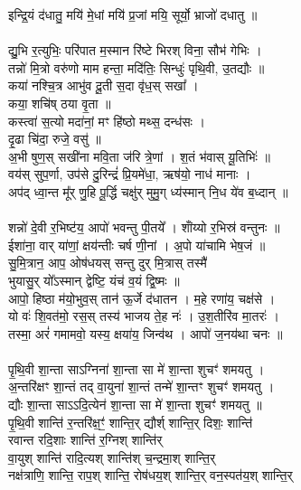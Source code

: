 इन्द्रि॒यं द॑धातु॒ मयि॑ मे॒धां मयि॑ प्र॒जां मयि॒ सूर्यो॒ भ्राजो॑ दधातु ॥\\
\\
द्यु॒भि र॒त्युभिः॒ परि॑पात म॒स्मान रि॑ष्टे भिरश् विना॒ सौभ॑ गेभिः । \\
तन्नो॑ मि॒त्रो वरु॑णो माम हन्ता॒ मदि॑तिः॒ सिन्धुः॑ पृथि॒वी, उ॒तद्यौः ॥\\
कया॑ नश्चि॒त्र आभु॑व दू॒ती स॒दा वृ॑ध॒स् सखा᳚ । \\
कया॒ शचि॑ष् ठया वृ॒ता ॥\\
कस्त्वा॑ स॒त्यो मदा॑नां॒ मꣳ हि॑ष्ठो मथ्स॒ दन्ध॑सः । \\
दृ॒ढा चि॑दा॒ रुजे॒ वसु॑ ॥\\
अ॒भी षुण॒स् सखी॑ना मवि॒ता ज॑रि त्रे॒णां । श॒तं भ॑वास् यू॒तिभिः॑ ॥\\
वय॑स् सुप॒र्णा, उप॑से दु॒रिन्द्रं॑ प्रि॒यमे॑धा॒, ऋष॑यो॒ नाध॑ मानाः । \\
अप॑द् ध्वा॒न्त मू᳚र् णु॒हि पू॒र्द्धि चक्षु॑र् मुमु॒ग् ध्य॑स्मान् नि॒ध ये॑व ब॒ध्दान् ॥\\
\\
शन्नो॑ दे॒वी र॒भिष्ट॑य॒ आपो॑ भवन्तु पी॒तये᳚ । शांँय्यो र॒भिस्र॑ वन्तुनः ॥\\
ईशा॑ना॒ वार् या॑णां॒ क्षय॑न्तीः चर्ष णी॒नां । अ॒पो या॑चामि भेष॒जं ॥\\
सु॒मि॒त्रान॒ आप॒ ओष॑धयस् सन्तु दुर् मि॒त्रास् तस्मै॑ \\
भुयासु॒र् यो᳚ऽस्मान् द्वेष्टि॒ यंच॑ व॒यं द्वि॒ष्मः ॥\\
आपो॒ हिष्ठा म॑यो॒भुव॒स् तान॑ ऊ॒र्जे द॑धातन । म॒हे रणा॑य॒ चक्ष॑से । \\
यो वः॑ शि॒वत॑मो॒ रस॒स् तस्य॑ भाजय ते॒ह नः॑ । उ॒श॒तीरि॑व मा॒तरः॑ ।\\
तस्मा॒ अरं॑ गमामवो॒ यस्य॒ क्षया॑य॒ जिन्व॑थ । आपो॑ ज॒नय॑था चनः ॥\\
\\
पृ॒थि॒वी शा॒न्ता साऽग्निना॑ शा॒न्ता सा मे॑ शा॒न्ता शुचꣳ॑ शमयतु । \\
अ॒न्तरि॑क्षꣳ शा॒न्तं तद् वा॒युना॑ शा॒न्तं तन्मे॑ शा॒न्तꣳ शुचꣳ॑ शमयतु । \\
द्यौः शा॒न्ता साऽऽदि॒त्येन॑ शा॒न्ता सा मे॑ शा॒न्ता शुचꣳ॑ शमयतु ॥\\
पृ॒थि॒वी शान्ति॑ र॒न्तरि॑क्ष॒ꣳ॒॑ शान्ति॒र् द्यौर्श् शान्ति॒र् दिशः॒ शान्ति॑ \\
रवान्त रदि॒शाः शान्ति॑ र॒ग्निश् शान्ति॑र्\\
वा॒युश् शान्ति॑ रादि॒त्यश् शान्ति॑श् च॒न्द्रमा॒श् शान्ति॒र्\\
नक्ष॑त्राणि॒ शान्ति॒ राप॒श् शान्ति॒ रोष॑धय॒श् शान्ति॒र् वन॒स्पत॑य॒श् शान्ति॒र्\\
